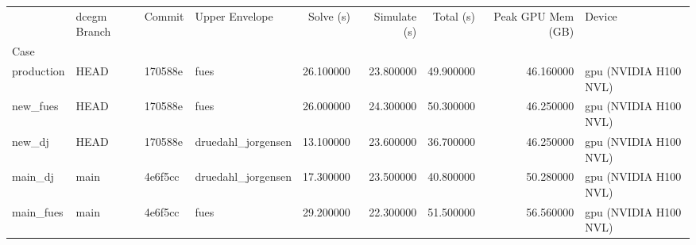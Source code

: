 \begin{tabular}{llllrrrrl}
\toprule
 & dcegm Branch & Commit & Upper Envelope & Solve (s) & Simulate (s) & Total (s) & Peak GPU Mem (GB) & Device \\
Case &  &  &  &  &  &  &  &  \\
\midrule
production & HEAD & 170588e & fues & 26.100000 & 23.800000 & 49.900000 & 46.160000 & gpu (NVIDIA H100 NVL) \\
new_fues & HEAD & 170588e & fues & 26.000000 & 24.300000 & 50.300000 & 46.250000 & gpu (NVIDIA H100 NVL) \\
new_dj & HEAD & 170588e & druedahl_jorgensen & 13.100000 & 23.600000 & 36.700000 & 46.250000 & gpu (NVIDIA H100 NVL) \\
main_dj & main & 4e6f5cc & druedahl_jorgensen & 17.300000 & 23.500000 & 40.800000 & 50.280000 & gpu (NVIDIA H100 NVL) \\
main_fues & main & 4e6f5cc & fues & 29.200000 & 22.300000 & 51.500000 & 56.560000 & gpu (NVIDIA H100 NVL) \\
\bottomrule
\end{tabular}
